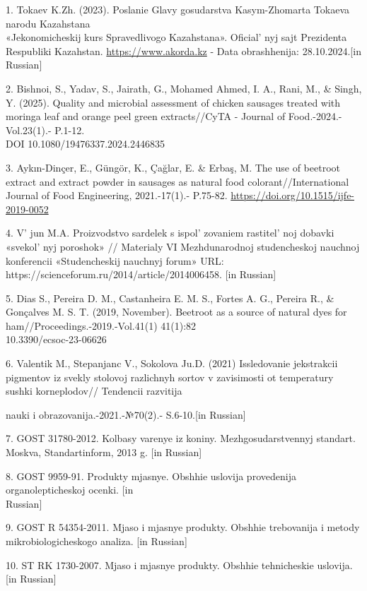 \begin{references}
1. Tokaev K.Zh. (2023). Poslanie Glavy gosudarstva Kasym-Zhomarta
Tokaeva narodu Kazahstana \\«Jekonomicheskij kurs Spravedlivogo
Kazahstana». Oficial' nyj sajt Prezidenta Respubliki
Kazahstan.
\href{https://www.akorda.kz/ru/poslanie-glavy-gosudarstva-kasym-zhomarta-tokaeva-narodu-kazahstana-ekonomicheskiy-kurs-spravedlivogo-kazahstana-18588}{https://www.akorda.kz}
- Data obrashhenija: 28.10.2024.{[}in Russian{]}

2. Bishnoi, S., Yadav, S., Jairath, G., Mohamed Ahmed, I. A., Rani, M.,
\& Singh, Y. (2025). Quality and microbial assessment of chicken
sausages treated with moringa leaf and orange peel green extracts//CyTA
- Journal of Food.-2024.-Vol.23(1).- P.1-12.\\
DOI 10.1080/19476337.2024.2446835

3. Aykın-Dinçer, E., Güngör, K., Çağlar, E. \& Erbaş, M. The use of
beetroot extract and extract powder in sausages as natural food
colorant//International Journal of Food Engineering, 2021.-17(1).-
P.75-82. \url{https://doi.org/10.1515/ijfe-2019-0052}{}

4. V' jun M.A. Proizvodstvo sardelek s
ispol' zovaniem rastitel' noj dobavki
«svekol' nyj poroshok» // Materialy VI Mezhdunarodnoj
studencheskoj nauchnoj konferencii «Studencheskij nauchnyj forum» URL:
https://scienceforum.ru/2014/article/2014006458. {[}in Russian{]}

5. Dias S., Pereira D. M., Castanheira E. M. S., Fortes A. G., Pereira
R., \& Gonçalves M. S. T. (2019, November). Beetroot as a source of
natural dyes for ham//Proceedings.-2019.-Vol.41(1) 41(1):82\\
10.3390/ecsoc-23-06626

6. Valentik M., Stepanjanc V., Sokolova Ju.D. (2021) Issledovanie
jekstrakcii pigmentov iz svekly stolovoj razlichnyh sortov v zavisimosti
ot temperatury sushki korneplodov// Tendencii razvitija

nauki i obrazovanija.-2021.-№70(2).- S.6-10.{[}in Russian{]}

7. GOST 31780-2012. Kolbasy varenye iz koniny. Mezhgosudarstvennyj
standart. Moskva, Standartinform, 2013 g. {[}in Russian{]}

8. GOST 9959-91. Produkty mjasnye. Obshhie uslovija provedenija
organolepticheskoj ocenki. {[}in \\Russian{]}

9. GOST R 54354-2011. Mjaso i mjasnye produkty. Obshhie trebovanija i
metody mikrobiologicheskogo analiza. {[}in Russian{]}

10. ST RK 1730-2007. Mjaso i mjasnye produkty. Obshhie tehnicheskie
uslovija. {[}in Russian{]}
\end{references}

